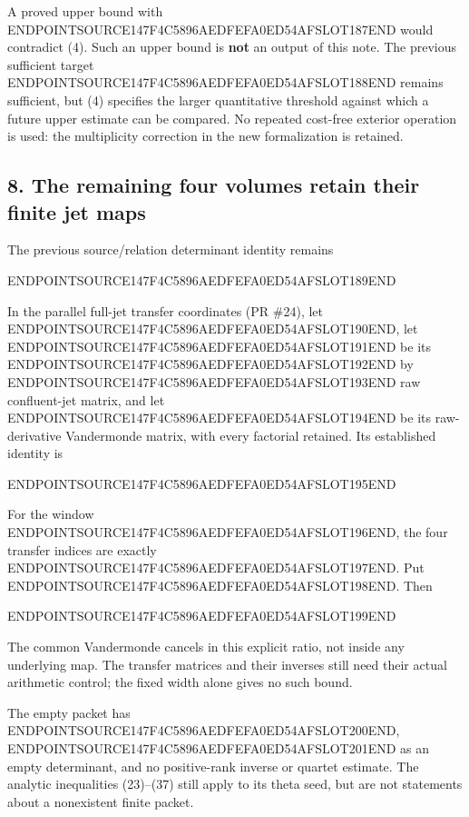 A proved upper bound with ENDPOINTSOURCE147F4C5896AEDFEFA0ED54AFSLOT187END would contradict (4). Such an upper bound is \textbf{not} an output of this note. The previous sufficient target ENDPOINTSOURCE147F4C5896AEDFEFA0ED54AFSLOT188END remains sufficient, but (4) specifies the larger quantitative threshold against which a future upper estimate can be compared. No repeated cost-free exterior operation is used: the multiplicity correction in the new formalization is retained.

\subsection{8. The remaining four volumes retain their finite jet maps}\label{endpoint-arithmetic_original--the-remaining-four-volumes-retain-their-finite-jet-maps}

The previous source/relation determinant identity remains

ENDPOINTSOURCE147F4C5896AEDFEFA0ED54AFSLOT189END

In the parallel full-jet transfer coordinates (PR \#24), let ENDPOINTSOURCE147F4C5896AEDFEFA0ED54AFSLOT190END, let ENDPOINTSOURCE147F4C5896AEDFEFA0ED54AFSLOT191END be its ENDPOINTSOURCE147F4C5896AEDFEFA0ED54AFSLOT192END by ENDPOINTSOURCE147F4C5896AEDFEFA0ED54AFSLOT193END raw confluent-jet matrix, and let ENDPOINTSOURCE147F4C5896AEDFEFA0ED54AFSLOT194END be its raw-derivative Vandermonde matrix, with every factorial retained. Its established identity is

ENDPOINTSOURCE147F4C5896AEDFEFA0ED54AFSLOT195END

For the window ENDPOINTSOURCE147F4C5896AEDFEFA0ED54AFSLOT196END, the four transfer indices are exactly ENDPOINTSOURCE147F4C5896AEDFEFA0ED54AFSLOT197END. Put ENDPOINTSOURCE147F4C5896AEDFEFA0ED54AFSLOT198END. Then

ENDPOINTSOURCE147F4C5896AEDFEFA0ED54AFSLOT199END

The common Vandermonde cancels in this explicit ratio, not inside any underlying map. The transfer matrices and their inverses still need their actual arithmetic control; the fixed width alone gives no such bound.

The empty packet has ENDPOINTSOURCE147F4C5896AEDFEFA0ED54AFSLOT200END, ENDPOINTSOURCE147F4C5896AEDFEFA0ED54AFSLOT201END as an empty determinant, and no positive-rank inverse or quartet estimate. The analytic inequalities (23)--(37) still apply to its theta seed, but are not statements about a nonexistent finite packet.

